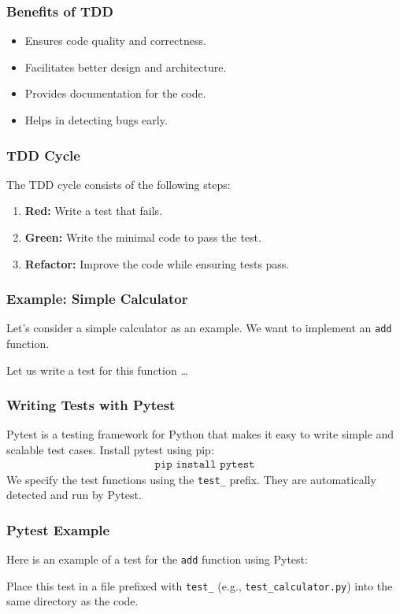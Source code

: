 \documentclass{beamer}
\begin{document}
\begin{frame}
  \frametitle{Benefits of TDD}
  \begin{itemize}
    \item Ensures code quality and correctness.
    \item Facilitates better design and architecture.
    \item Provides documentation for the code.
    \item Helps in detecting bugs early.
  \end{itemize}
\end{frame}

\begin{frame}
  \frametitle{TDD Cycle}
  The TDD cycle consists of the following steps:
  \begin{enumerate}
    \item \textbf{Red:} Write a test that fails.
    \item \textbf{Green:} Write the minimal code to pass the test.
    \item \textbf{Refactor:} Improve the code while ensuring tests pass.
  \end{enumerate}
\end{frame}

\begin{frame}
  \frametitle{Example: Simple Calculator}
  Let's consider a simple calculator as an example. We want to implement an \texttt{add} function.
  
  \vspace{5mm}
  Let us write a test for this function \dots
\end{frame}

\begin{frame}
  \frametitle{Writing Tests with Pytest}
  Pytest is a testing framework for Python that makes it easy to write simple and scalable test cases.
  Install pytest using pip:
  \begin{align*}
  \texttt{pip install pytest}
  \end{align*}
  We specify the test functions using the \texttt{test\_} prefix. They are automatically detected and run by Pytest.
\end{frame}

\begin{frame}
  \frametitle{Pytest Example}
  Here is an example of a test for the \texttt{add} function using Pytest:
  
  Place this test in a file prefixed with \texttt{test\_} (e.g., \texttt{test\_calculator.py}) into the same directory as the code.
\end{frame}
\end{document}
